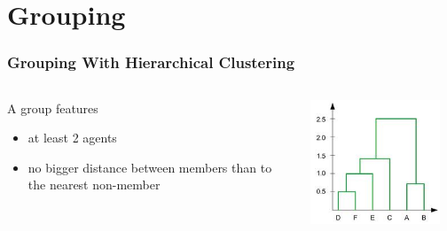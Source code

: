 \documentclass[10pt]{beamer}
\begin{document}
\section{Grouping}
\begin{frame}\frametitle{Grouping With Hierarchical Clustering}
    \begin{columns}[c,onlytextwidth]
        \begin{column}[t]{5cm}
            A group features
            \begin{itemize}
                \item at least 2 agents
                \item no bigger distance between members than to the
                nearest non-member
            \end{itemize}
        \end{column}
        \begin{column}[t]{5cm}
            \includegraphics[width=0.9\textwidth]{src/cluster.jpg}
        \end{column}
    \end{columns}

\end{frame}
\end{document}
